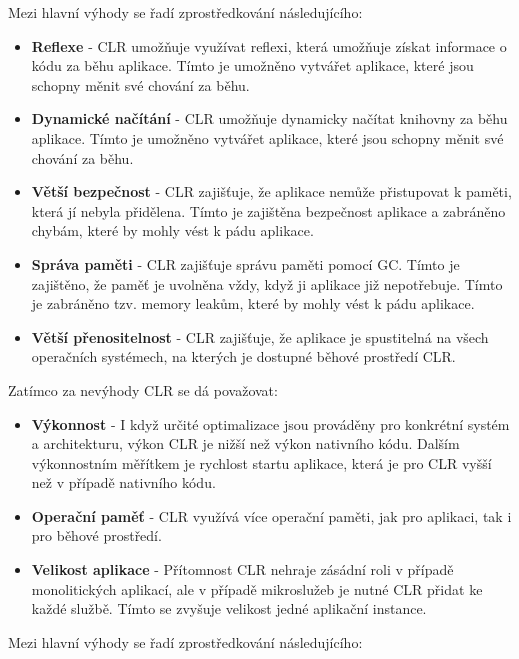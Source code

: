 Mezi hlavní výhody se řadí zprostředkování následujícího:

\begin{itemize}
    \item  \textbf{Reflexe} - CLR umožňuje využívat reflexi, která umožňuje získat informace o kódu za běhu aplikace. Tímto je umožněno vytvářet aplikace, které jsou schopny měnit své chování za běhu.
    \item \textbf{Dynamické načítání} - CLR umožňuje dynamicky načítat knihovny za běhu aplikace. Tímto je umožněno vytvářet aplikace, které jsou schopny měnit své chování za běhu.
    \item \textbf{Větší bezpečnost} - CLR zajišťuje, že aplikace nemůže přistupovat k paměti, která jí nebyla přidělena. Tímto je zajištěna bezpečnost aplikace a zabráněno chybám, které by mohly vést k pádu aplikace.
    \item \textbf{Správa paměti} - CLR zajišťuje správu paměti pomocí GC. Tímto je zajištěno, že paměť je uvolněna vždy, když ji aplikace již nepotřebuje. Tímto je zabráněno tzv. memory leakům, které by mohly vést k pádu aplikace.
    \item \textbf{Větší přenositelnost} - CLR zajišťuje, že aplikace je spustitelná na všech operačních systémech, na kterých je dostupné běhové prostředí CLR.
\end{itemize}


Zatímco za nevýhody CLR se dá považovat:

\begin{itemize}
    \item  \textbf{Výkonnost} - I když určité optimalizace jsou prováděny pro konkrétní systém a architekturu, výkon CLR je nižší než výkon nativního kódu. Dalším výkonnostním měřítkem je rychlost startu aplikace, která je pro CLR vyšší než v případě nativního kódu.
    \item \textbf{Operační paměť} - CLR využívá více operační paměti, jak pro aplikaci, tak i pro běhové prostředí.
    \item \textbf{Velikost aplikace} - Přítomnost CLR nehraje zásádní roli v případě monolitických aplikací, ale v případě mikroslužeb je nutné CLR přidat ke každé službě. Tímto se zvyšuje velikost jedné aplikační instance.
\end{itemize}



Mezi hlavní výhody se řadí zprostředkování následujícího:

